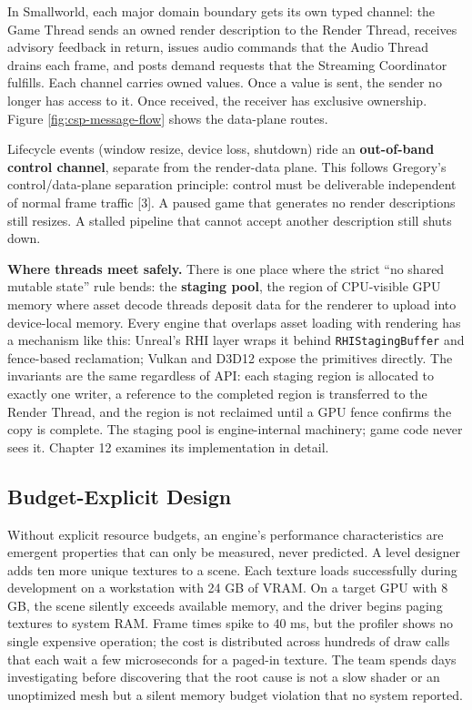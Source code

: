 \documentclass[
  11pt,
  letterpaper,
  DIV=11,
  numbers=noendperiod,
  twoside,
  open=right]{scrreprt}
\begin{document}
In Smallworld, each major domain boundary gets its own typed channel:
the Game Thread sends an owned render description to the Render Thread,
receives advisory feedback in return, issues audio commands that the
Audio Thread drains each frame, and posts demand requests that the
Streaming Coordinator fulfills. Each channel carries owned values. Once
a value is sent, the sender no longer has access to it. Once received,
the receiver has exclusive ownership. Figure \ref{fig:csp-message-flow}
shows the data-plane routes.



Lifecycle events (window resize, device loss, shutdown) ride an
\textbf{out-of-band control channel}, separate from the render-data
plane. This follows Gregory's control/data-plane separation principle:
control must be deliverable independent of normal frame traffic {[}3{]}.
A paused game that generates no render descriptions still resizes. A
stalled pipeline that cannot accept another description still shuts
down.

\textbf{Where threads meet safely.} There is one place where the strict
``no shared mutable state'' rule bends: the \textbf{staging pool}, the
region of CPU-visible GPU memory where asset decode threads deposit data
for the renderer to upload into device-local memory. Every engine that
overlaps asset loading with rendering has a mechanism like this:
Unreal's RHI layer wraps it behind \texttt{RHIStagingBuffer} and
fence-based reclamation; Vulkan and D3D12 expose the primitives
directly. The invariants are the same regardless of API: each staging
region is allocated to exactly one writer, a reference to the completed
region is transferred to the Render Thread, and the region is not
reclaimed until a GPU fence confirms the copy is complete. The staging
pool is engine-internal machinery; game code never sees it. Chapter 12
examines its implementation in detail.

\subsection{Budget-Explicit Design}\label{budget-explicit-design}

Without explicit resource budgets, an engine's performance
characteristics are emergent properties that can only be measured, never
predicted. A level designer adds ten more unique textures to a scene.
Each texture loads successfully during development on a workstation with
24 GB of VRAM. On a target GPU with 8 GB, the scene silently exceeds
available memory, and the driver begins paging textures to system RAM.
Frame times spike to 40 ms, but the profiler shows no single expensive
operation; the cost is distributed across hundreds of draw calls that
each wait a few microseconds for a paged-in texture. The team spends
days investigating before discovering that the root cause is not a slow
shader or an unoptimized mesh but a silent memory budget violation that
no system reported.
\end{document}
